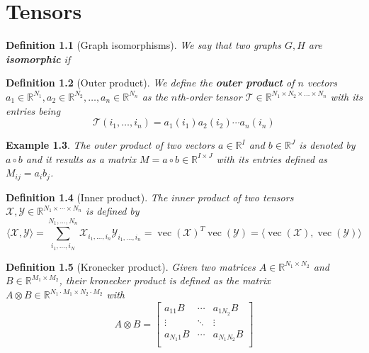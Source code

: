 \documentclass[11pt,a4paper,openright,oneside]{book}
\numberwithin{equation}{section}
\newtheorem{defn0}{Definition}[chapter]
\newtheorem{example0}[defn0]{Example}
\newenvironment{definition}{ \begin{defn0}}{\end{defn0}}
\newenvironment{example}{ \begin{example0}\rm}{\end{example0}}
\DeclareMathOperator{\vectorize}{vec}
\begin{document}
\chapter{Tensors}


\iffalse
\begin{definition}[Graph isomorphisms]
    We say that two graphs $G, H$ are \textbf{isomorphic} if 
\end{definition}


\begin{definition}[Outer product]
    We define the \textbf{outer product} of $n$ vectors 
    $a_1 \in \mathbb{R}^{N_1}, a_2 \in \mathbb{R}^{N_2}, \dots, a_n \in \mathbb{R}^{N_n}$
    as the $n$th-order tensor $\mathcal{T} \in \mathbb{R}^{N_1 \times N_2 \times \dots \times N_n}$ with its entries being
    $$\mathcal{T}(i_1, \dots, i_n) = a_1(i_1) a_2(i_2) \cdots a_n(i_n)$$
\end{definition}

\begin{example}
The outer product of two vectors $a \in \mathbb{R}^I$ and $b \in \mathbb{R}^J$ is denoted by $a \circ b$ and it results
as a matrix $M = a \circ b \in \mathbb{R}^{I \times J}$ with its entries defined as $M_{ij} = a_i b_j$.
\end{example}


\begin{definition}[Inner product]
The inner product of two tensors $\mathcal{X}, \mathcal{Y} \in \mathbb{R}^{N_1 \times \cdots \times N_n}$ is defined by
$$\langle \mathcal{X},\mathcal{Y} \rangle = \sum_{i_1, \dots, i_N}^{N_1, \dots, N_n} \mathcal{X}_{i_1, \dots, i_n} \mathcal{Y}_{i_1, \dots, i_n} = 
\vectorize(\mathcal{X})^T \vectorize(\mathcal{Y}) = \langle \vectorize(\mathcal{X}), \vectorize(\mathcal{Y}) \rangle$$
\end{definition}


\begin{definition}[Kronecker product]
     Given two matrices $A \in \mathbb{R}^{N_1 \times N_2}$ and $B \in \mathbb{R}^{M_1 \times M_2}$,
    their kronecker product is defined as the matrix $A \otimes B \in \mathbb{R}^{N_1 \cdot M_1 \times N_2 \cdot M_2}$ with
    $$A \otimes B = \begin{bmatrix}
        a_{11}B & \cdots & a_{1N_2}B \\ 
        \vdots & \ddots & \vdots \\
        a_{N_1 1}B & \cdots & a_{N_1 N_2}B \\
    \end{bmatrix}$$
\end{definition}
\end{document}

